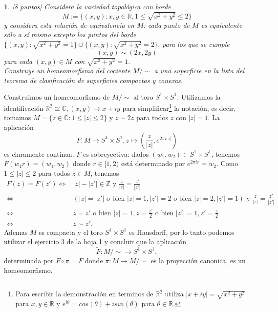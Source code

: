 \documentclass[12pt,a4paper]{report}
\theoremstyle{definition}
\newtheorem{ex}{}
\newcommand{\ZZ}{\ensuremath{\mathbb Z}}
\newcommand{\CC}{\ensuremath{\mathbb C}}
\newcommand{\RR}{\ensuremath{\mathbb R}}
\begin{document}
 
\begin{ex}\emph{[8 puntos]    
Considera la variedad topol\'ogica con borde $$M:=\{(x,y):x,y \in \RR,  1 \le \sqrt{x^2+y^2}\le 2\}$$
y considera esta relaci\'on de equivalencia   en $M$: cada punto de $M$ es equivalente s\'olo a s\'i mismo excepto  los puntos del borde $\{(x,y): \sqrt{x^2+y^2}=1\}\cup \{(x,y): \sqrt{x^2+y^2}=2\}$, para los que se cumple
$$(x,y) \sim (2x,2y)$$
para cada $(x,y) \in M$ con $\sqrt{x^2+y^2}=1$.\\
Construye un homeomorfismo del cociente  $M/\sim$ a una superficie en
la lista del teorema de clasificaci\'on de superficies compactas y conexas.\\
}

Construimos un homeomorfismo de $M/\sim$ al toro $S^1 \times S^1$.
Utilizamos la identificaci\'on $\RR^2\cong \CC, (x,y)\mapsto x+i y$ para simplificar\footnote{Para escribir la demonstraci\'on en terminos de $\RR^2$ utiliza $|x+iy|=\sqrt{x^2+y^2}$ para $x,y \in \RR$ y $e^{i\theta}=cos(\theta)+i sin(\theta)$
para $\theta\in \RR$.} 
 la notaci\'on, es decir, tomamos $M=\{z\in \CC:1\le |z|\le 2\}$ y $z\sim 2 z$ para todos $z$ con $|z|=1$.
La aplicaci\'on $$F \colon M \to S^1\times S^1, z\mapsto \left(\frac{z}{|z|},e^{2 \pi i |z|}\right)
$$
es claramente continua. $F$ es sobreyectiva: dados $(w_1,w_2)\in S^1\times S^1$,
tenemos $F(w_1r)=(w_1,w_2)$ donde $r\in [1,2)$ est\'a determinado por $e^{2  \pi i r}=w_2$. Como  $1\le |z|\le 2$ para todos $z\in M$,  tenemos 
\begin{align*}
F(z)=F(z') \Leftrightarrow &
 |z|-|z'|\in \ZZ \text{ y } \frac{z}{|z|}=\frac{z'}{|z'|}\\
\Leftrightarrow &(|z|=|z'| \text{ o bien } |z|=1,|z'|=2 \text{ o bien }|z|=2,|z'|=1) \text{ y }
\frac{z}{|z|}=\frac{z'}{|z'|}\\
\Leftrightarrow &z=z' \text{ o bien } |z|=1, z=\frac{z'}{2} \text{ o bien }|z'|=1, z'=\frac{z}{2}\\
 \Leftrightarrow &
z \sim z'.    
\end{align*}
Ademas $M$ es compacta y el toro $S^1 \times S^1$ es Hausdorff, por lo tanto podemos utilizar el ejercicio 3 de la hoja 1 y concluir que la aplicaci\'on $$\tilde{F} \colon M/\sim \to S^1 \times S^1,$$ determinada por $\tilde{F} \circ \pi = F$ donde $\pi \colon M \to M/\sim$ es la proyecci\'on canonica, es un homeomorfismo.
\end{ex}
\end{document}
